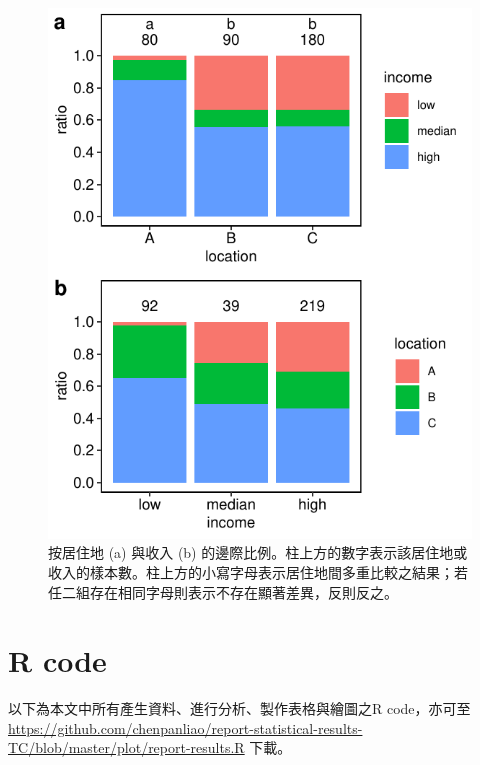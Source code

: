 \documentclass[12pt]{article}
\begin{document}
\begin{figure}[htb!]
	\centering
	\includegraphics[]{chisq_independent.pdf}
	\caption{按居住地 (a) 與收入 (b) 的邊際比例。柱上方的數字表示該居住地或收入的樣本數。柱上方的小寫字母表示居住地間多重比較之結果；若任二組存在相同字母則表示不存在顯著差異，反則反之。}
	\label{fig:chisq_independent}
\end{figure}


\appendix
\section{R code}
以下為本文中所有產生資料、進行分析、製作表格與繪圖之R code，亦可至 \url{https://github.com/chenpanliao/report-statistical-results-TC/blob/master/plot/report-results.R} 下載。
\end{document}
